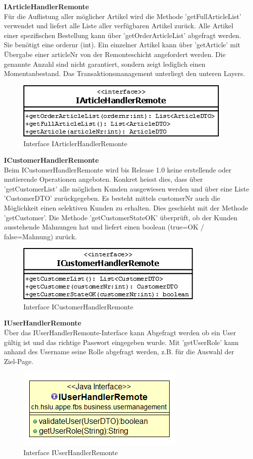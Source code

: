 \textbf{IArticleHandlerRemonte}\\
Für die Auflistung aller möglicher Artikel wird die Methode 'getFullArticleList' verwendet und liefert alle Liste aller verfügbaren Artikel zurück. Alle Artikel einer spezifischen Bestellung kann über 'getOrderArticleList' abgefragt werden. Sie benötigt eine ordernr (int). Ein einzelner Artikel kann über 'getArticle' mit Übergabe einer articleNr von der Remonteschicht angefordert werden. Die genannte Anzahl sind nicht garantiert, sondern zeigt lediglich einen Momentanbestand. Das Transaktionsmanagement unterliegt den unteren Layers.
\begin{figure}[H]
	\includegraphics[width=0.6\linewidth]{Images/IArticleHandlerRemonte}
	\caption{Interface IArticlerHandlerRemonte}
	\label{fig:if-IArticleHandlerRemonte}
\end{figure}

\textbf{ICustomerHandlerRemonte}\\
Beim ICustomerHandlerRemonte wird bis Release 1.0 keine erstellende oder mutierende Operationen angeboten. Konkret heisst dies, dass über 'getCustomerList' alle möglichen Kunden ausgewiesen werden und über eine Liste 'CustomerDTO' zurückgegeben. Es besteht mittels customerNr auch die Möglichkeit einen selektiven Kunden zu erhalten. Dies geschieht mit der Methode 'getCustomer'.
Die Methode 'getCustomerStateOK' überprüft, ob der Kunden ausstehende Mahnungen hat und liefert einen boolean (true=OK / false=Mahnung) zurück.
\begin{figure}[H]
	\includegraphics[width=0.4\linewidth]{Images/ICustomerHandlerRemonte}
	\caption{Interface ICustomerHandlerRemonte}
	\label{fig:if-ICustomerHandler}
\end{figure}

\textbf{IUserHandlerRemonte}\\
Über das IUserHandlerRemonte-Interface kann Abgefragt werden ob ein User gültig ist und das richtige Passwort eingegeben wurde. Mit 'getUserRole' kann anhand des Username seine Rolle abgefragt werden, z.B. für die Auswahl der Ziel-Page. 
\begin{figure}[H]
	\includegraphics[width=0.4\linewidth]{Images/IUserHandlerRemonte}
	\caption{Interface IUserHandlerRemonte}
	\label{fig:if-IUserHandlerRemonte}
\end{figure}


